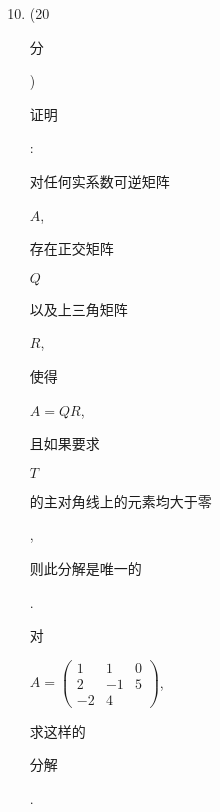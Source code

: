 \documentclass[10pt]{article}
\begin{document}
\begin{enumerate}
  \setcounter{enumi}{9}
  \item (20 \begin{CJK}{UTF8}{mj}分\end{CJK}) \begin{CJK}{UTF8}{mj}证明\end{CJK}: \begin{CJK}{UTF8}{mj}对任何实系数可逆矩阵\end{CJK} $A$, \begin{CJK}{UTF8}{mj}存在正交矩阵\end{CJK} $Q$ \begin{CJK}{UTF8}{mj}以及上三角矩阵\end{CJK} $R$, \begin{CJK}{UTF8}{mj}使得\end{CJK} $A=Q R$, \begin{CJK}{UTF8}{mj}且如果要求\end{CJK} $T$ \begin{CJK}{UTF8}{mj}的主对角线上的元素均大于零\end{CJK},\begin{CJK}{UTF8}{mj}则此分解是唯一的\end{CJK}. \begin{CJK}{UTF8}{mj}对\end{CJK} $A=\left(\begin{array}{rrr}1 & 1 & 0 \\ 2 & -1 & 5 \\ -2 & 4\end{array}\right)$, \begin{CJK}{UTF8}{mj}求这样的\end{CJK} \begin{CJK}{UTF8}{mj}分解\end{CJK}.
\end{enumerate}
\end{document}
